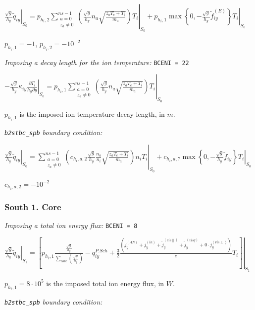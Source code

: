 \documentclass[a4paper,10pt]{report}
\begin{document}
$\left. \frac{\sqrt g}{h_y} \widetilde q_{iy} \right|_{S_0}
= \left.
p_{h_i,2} \sum \limits^{ns-1}_{\substack{a = 0 \\ z_a \neq 0}} \left(
	\frac{\sqrt g}{h_y} n_a \sqrt{\frac{z_a T_e + T_i}{m_a}}
\right) T_i \right|_{S_0} + \left.
p_{h_i,1} \max \left\{0, -\frac{\sqrt g}{h_y} \widetilde f_{iy}^{(E)} \right\} T_i
\right|_{S_0}$

$p_{h_i,1} = -1$, $p_{h_i,2} = -10^{-2}$

{\em Imposing a decay length for the ion temperature:} {\tt BCENI = 22}

$\left. -\frac{\sqrt g}{h_y} \kappa_{iy} \frac{\partial T_i}{h_y \partial y} \right|_{S_0}
= \left.
p_{h_i,1} \sum \limits^{ns-1}_{\substack{a = 0 \\ z_a \neq 0}} \left(
	\frac{\sqrt g}{h_y} n_a \sqrt{\frac{z_a T_e + T_i}{m_a}}
\right) T_i \right|_{S_0}$

$p_{h_i,1}$ is the imposed ion temperature decay length, in $m$.

{\em {\tt b2stbc\_spb} boundary condition:}

$\left. \frac{\sqrt g}{h_y} \widetilde q_{iy} \right|_{S_0}
= \left.
\sum \limits^{ns-1}_{\substack{a = 0 \\ z_a \neq 0}} \left(
	c_{h_i,a,2} \frac{\sqrt g}{h_y} \frac{n_a}{n_i} \sqrt{\frac{z_a T_e + T_i}{m_a}}
\right) n_i T_i \right|_{S_0}
+ \left.
c_{h_i,a,7} \max \left\{0, -\frac{\sqrt g}{h_y} \widetilde f_{iy} \right\} T_i
\right|_{S_0}$

$c_{h_i,a,2} = -10^{-2}$

\subsubsection{South 1. Core}

{\em Imposing a total ion energy flux:} {\tt BCENI = 8}


$\left. \frac{\sqrt g}{h_y} \widetilde q_{iy} \right|_{S_1} = \left. \left[ p_{h_i,1} \frac{
	\frac{\sqrt g}{h_y}}
	{\sum \limits_{core} \left( \frac{\sqrt g}{h_y} \right)}
        - q_{iy}^{P.Sch}
        + \frac{3}{2} \frac{\left( j_y^{(AN)} + j_y^{(in)} + \widetilde{j}_y^{(vis \parallel)} + \widetilde{j}_y^{(visq)} + 0 \cdot j_y^{(vis \perp)} \right)}{e} T_i
\right] \right|_{S_1}$

$p_{h_i,1} = 8 \cdot 10^5$ is the imposed total ion energy flux, in $W$.

{\em {\tt b2stbc\_spb} boundary condition:}
\end{document}
